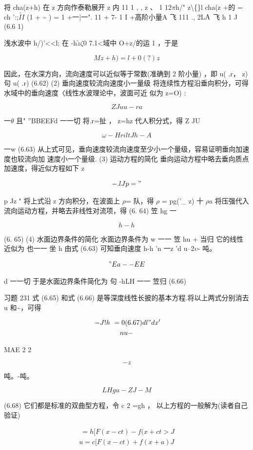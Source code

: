 将 cha(z+h) 在 z 方向作泰勒展开 z 内 11 1 , , z 、 1 12$\pi$h/" z\textbackslash\{\}l cha(z +的 = ch ':;$\tilde{II}$ (1 + \textasciitilde{} ) = 1 +一|一". 11 + 7- 1 I +高阶小量A 飞 111 ., 2L${\rm A}$ 飞 h 1 J (6.6 1)

浅水波中 h/)'<<l; 在 -h$\tilde{z}$$\zeta$0 7.1<域中 O+z/的运 1 ，于是

\[Mz+h)=l+0(?)z\]

因此，在水深方向，流向速度可以近似等于常数(准确到 2 阶小量) ，即 u( .r， z) 句 u( .r) (6.62) (2) 垂向速度较流向速度小一量级 将连续性方程沿垂向积分，可得水域中的垂向速度〈线性水波理论中，波面可近 似为 z=O) :

\[Z Ju u-r a\]

一$\theta$ 且" ''BBEEFd 一一切 将.r=扯 ， z=hz 代人积分式，得 Z JU

\[\omega -H riltJ h-A\]

一w (6.63) 从上式可见，垂向速度较流向速度至少小一个量级，容易证明垂向加速度也较流向加 速度小一个量级. (3) 运动方程的简化 垂向运动方程中略去垂向质点加速度，得近似方程如下 z

\[-.l Jp = "\]

p Jz " 将上式沿 z 方向积分，在波面上 $\rho$= 队，得 $\rho$ = pg('\_ z) 十 $\rho$a 将压强代入流向运动方程，并略去非线性对流项，得 (6. 64) 笠 hg 一

\[h-h\]

(6. 65) (4) 水面边界条件的简化 水面边界条件为 w 一一 笠 hu + 当归 它的线性近似为 也一一 坐 h 由式 (6.63) 可知垂向速度 h-h 'n 一z 'd u--2$\upsilon$- 吨。

\["Ea--EE\]

d 一一切 于是水面边界条件简化为 句 -hLH 一一 笠归 (6.66)

习题 231 式 (6.65) 和式 (6.66) 是等深度线性长披的基本方程.将以上两式分别消去 u 和\textasciitilde{}，可得

\begin{gather*}
~-J!h ~ = 0 (6.67) d l" dx'\\
nu -
\end{gather*}

MAE 2 2

\[-z\]

吨。-吨。

\[LH g u-Z J-M\]

(6.68) 它们都是标准的双曲型方程，令 c 2 =gh ， 以上方程的一般解为(读者自己验证)

\begin{gather*}
~ = h[F(x-ct) - f(x+c t> J\\
u = c[F(x-ct) + f(x+a)J
\end{gather*}

